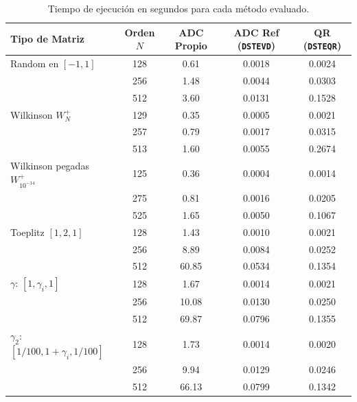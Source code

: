 \documentclass[11pt,a4paper]{article}
\begin{document}
\begin{table}[htbp]
    \centering
    \caption{Tiempo de ejecución en segundos para cada método evaluado.}
    \label{tab:tiempos}
    \begin{tabular}{@{} l c c c c @{}}
        \toprule
        \textbf{Tipo de Matriz} & \textbf{Orden $N$} & \textbf{ADC Propio} & \textbf{ADC Ref (\texttt{DSTEVD})} & \textbf{QR (\texttt{DSTEQR})} \\
        \midrule
        Random en $[-1, 1]$ & 128 & 0.61  & 0.0018 & 0.0024 \\
                            & 256 & 1.48  & 0.0044 & 0.0303 \\
                            & 512 & 3.60  & 0.0131 & 0.1528 \\
        \midrule
        Wilkinson $W_N^+$   & 129 & 0.35  & 0.0005 & 0.0021 \\
                            & 257 & 0.79  & 0.0017 & 0.0315 \\
                            & 513 & 1.60  & 0.0055 & 0.2674 \\
        \midrule
        Wilkinson pegadas $W_{10^{-14}}^+$ & 125 & 0.36  & 0.0004 & 0.0014 \\
                            & 275 & 0.81  & 0.0016 & 0.0205 \\
                            & 525 & 1.65  & 0.0050 & 0.1067 \\
        \midrule
        Toeplitz $[1, 2, 1]$ & 128 & 1.43  & 0.0010 & 0.0021 \\
                            & 256 & 8.89  & 0.0084 & 0.0252 \\
                            & 512 & 60.85 & 0.0534 & 0.1354 \\
        \midrule
        $\gamma$: $[1, \gamma_i, 1]$ & 128 & 1.67  & 0.0014 & 0.0021 \\
                            & 256 & 10.08 & 0.0130 & 0.0250 \\
                            & 512 & 69.87 & 0.0796 & 0.1355 \\
        \midrule
        $\gamma_2$: $[1/100, 1+\gamma_i, 1/100]$ & 128 & 1.73  & 0.0014 & 0.0020 \\
                            & 256 & 9.94  & 0.0129 & 0.0246 \\
                            & 512 & 66.13 & 0.0799 & 0.1342 \\
        \bottomrule
    \end{tabular}
\end{table}
\end{document}
